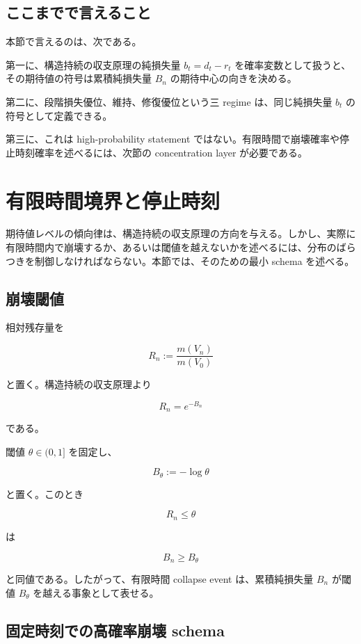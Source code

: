 \documentclass[12pt,a4paper]{article}
\begin{document}
\subsection{ここまでで言えること}\label{ux3053ux3053ux307eux3067ux3067ux8a00ux3048ux308bux3053ux3068}

本節で言えるのは、次である。

第一に、構造持続の収支原理の純損失量 \(b_{t}=d_{t}-r_{t}\) を確率変数として扱うと、その期待値の符号は累積純損失量 \(B_{n}\) の期待中心の向きを決める。

第二に、段階損失優位、維持、修復優位という三 regime は、同じ純損失量 \(b_{t}\) の符号として定義できる。

第三に、これは high-probability statement ではない。有限時間で崩壊確率や停止時刻確率を述べるには、次節の concentration layer が必要である。

\section{有限時間境界と停止時刻}\label{ux6709ux9650ux6642ux9593ux5883ux754cux3068ux505cux6b62ux6642ux523b}

期待値レベルの傾向律は、構造持続の収支原理の方向を与える。しかし、実際に有限時間内で崩壊するか、あるいは閾値を越えないかを述べるには、分布のばらつきを制御しなければならない。本節では、そのための最小 schema を述べる。

\subsection{崩壊閾値}\label{ux5d29ux58caux95beux5024}

相対残存量を

\[
R_{n} := \frac{m(V_{n})}{m(V_0)}
\]

と置く。構造持続の収支原理より

\[
R_{n} = e^{-B_{n}}
\]

である。

閾値 \(\theta\in(0,1]\) を固定し、

\[
B_\theta := -\log \theta
\]

と置く。このとき

\[
R_{n} \le \theta
\]

は

\[
B_{n} \ge B_\theta
\]

と同値である。したがって、有限時間 collapse event は、累積純損失量 \(B_{n}\) が閾値 \(B_\theta\) を越える事象として表せる。

\subsection{固定時刻での高確率崩壊 schema}\label{ux56faux5b9aux6642ux523bux3067ux306eux9ad8ux78baux7387ux5d29ux58ca-schema}
\end{document}
